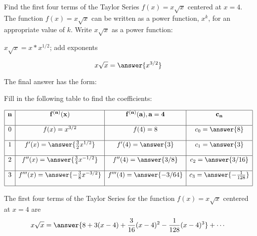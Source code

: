 \documentclass{ximera}
\begin{document}
\begin{problem} Find the first four terms of the Taylor Series $f(x) = x\sqrt x$ centered at $x = 4$.\\

The function $f(x) = x\sqrt x$ can be written as a power function, $x^k$, for an appropriate value of $k$.
Write $x\sqrt x$ as a power function:
\begin{hint}
$x\sqrt x = x*x^{1/2}$; add exponents
\end{hint}
\[
x\sqrt x = \answer{x^{3/2}}
\]


The final answer has the form:
\begin{center}
\begin{multipleChoice}
\end{multipleChoice}
\end{center}

Fill in the following table to find the coefficients:

\[
\begin{array}{|c|c|c|c|} 
\hline
\bf{n} & \bf{f^{(n)}(x)} & \bf{f^{(n)}(a), a = 4} & \bf{c_n} \\[1em] 
\hline
 0 & f(x) = x^{3/2} & f(4) = 8 & c_0 = \answer{8} \\[1em]
\hline
1 & f'(x) = \answer{\frac32 x^{1/2}} & f'(4) = \answer{3} & c_1 = \answer{3} \\[1em]
\hline
 2 & f''(x) =\answer{\frac34 x^{-1/2}} & f''(4) = \answer{3/8} & c_2 = \answer{3/16} \\[1em]
\hline
 3 & f'''(x) =\answer{-\frac38 x^{-3/2}} & f'''(4) = \answer{-3/64} & c_3 = \answer{-\frac{1}{128}}\\[1em]
\hline
\end{array}
\]


The first four terms of the Taylor Series for the function $f(x) = x\sqrt x$ centered at $x = 4$ are
\[
x\sqrt x = \answer{8 + 3(x-4) +\frac{3}{16}(x-4)^2 - \frac{1}{128}(x-4)^3} + \cdots
\]


\end{problem}
\end{document}
